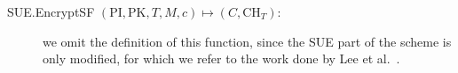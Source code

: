 \documentclass[a4paper,10pt]{article}
\newcommand{\Z}{\mathbb{Z}}
\newcommand{\maps}[2]{$ \left( #1 \right) \mapsto \left( #2 \right) $}
\newcommand{\mapssingleoutput}[2]{$ \left( #1 \right) \mapsto #2 $}
\newcommand{\algorithmdef}[4]{\item[#1.#2 \maps{#3}{#4}:]}
\newcommand{\algorithmdefsingleoutput}[4]{\item[#1.#2 \mapssingleoutput{#3}{#4}:] }
\begin{document}
\begin{description}
\begin{comment}
	We output the semi-functional time key \[\mathrm{TK}_{T,R}=\left( CV_R, \mathrm{SK}_{\textnormal{SUE},1}, \ldots, \mathrm{SK}_{\textnormal{SUE},m} \right)\].



\algorithmdef{SUE}{EncryptSF}{\mathrm{PK},T,c}{EK,CH_{S,T}}  first we generate a standard ciphertext header $CH^\prime_T=\left(CH^{\prime(0)},\ldots,CH^{\prime(d)}\right)$ for a time $T$ and a session key $EK^\prime$. Moreover we denote with $L^{(h)}=L\vert_{d-h}\|1$ the label of length $d^{(h)}$ associated with the ciphertext header $CH^{\prime(h)}$. We call also $L=L^{(0)}$.
We choose randomly the elements $u\in \Z_N$, $z_1,\ldots,z_d\in\Z_N$, and $z^\prime_1,\ldots,z^\prime_d\in\Z_N$.
We define then $\vec{z}=(z_1,\ldots,z_d)$.
\begin{enumerate}
	\item
	We write the first CDE header as $CH^{\prime(0)}=\left(C_0^\prime,C_1^\prime,\{C^\prime_{2,i}\}_{i=1}^d\right)$.
	The first semi-functional CDE ciphertext for $CH^{\prime(0)}$ is $
		CH^{(0)} = \left( C_0=C^\prime_0 g_2^c,
		C_1=C^\prime_1 g_2^{u + \sum_{i=1}^d f_{i,L[i]}(L\vert_i)z_i},\{ C_{2,i}=C^\prime_{2,i}g_2^{-z_i} \}_{i=1}^d \right).$
	\item
	For each $j$ from $1$ to $d$ we do the following:
	\begin{itemize}
		\item
		If $CH^{\prime(j)}$ is empty, then $CH^{(j)}$ remains empty.
		\item
		Otherwise we fix $CH^{\prime(h)}=\left(C^\prime_1,C^\prime_{2,d^{(h)}}\right)$ and we set:
	\begin{flalign*}
		&C_1=C^\prime_1 g_2^{
			u + 
			\sum_{i=1}^{d^{(j)}-1}
				\left( f_{i,L^{(j)}[i]}\left(L^{(j)}\vert_i\right)z_i \right) 
			+ f_{d^{(j)},L^{(j)}[d^{(j)}]}\left(L^{(j)}\vert_{d^{(j)}}\right)z^\prime_{d^{(j)}}
		}; &\\
		&C_{2,d^{(j)}}=C^\prime_{2,d^{(j)}}g_2^{-z^\prime_{d^{(j)}}}; \\
		&CH^{(j)} = \left( C_1, C_{2,d^{(j)}} \right). 
	\end{flalign*}
	\end{itemize}
\end{enumerate}
The final output is	$EK=EK^\prime$ and $CH_T=\left( CH^{(0)}, \ldots, CH^{(d)} \right)$.

\algorithmdefsingleoutput{RS-ABE}{UpdateKeySF}{\mathrm{PK},\mathrm{MK},T,R}{\mathrm{TK}_{T,R}}
\end{comment}
\algorithmdef{SUE}{EncryptSF}{\mathrm{PI},\mathrm{PK},T,M,c}{C,\mathrm{CH}_{T}} we omit the definition of this  function, since the SUE part of the scheme is only modified, for which we refer to the work done by Lee et al.~\cite{lee2013RSABE}.


\end{description}
\end{document}
